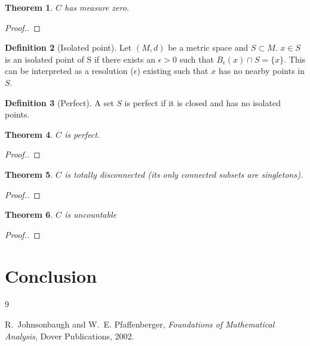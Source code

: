\documentclass[11pt]{article}
\theoremstyle{plain}
\newtheorem{theorem}{Theorem}[section]
\theoremstyle{definition}
\newtheorem{definition}[theorem]{Definition}
\theoremstyle{remark}
\begin{document}
\begin{theorem}
$C$ has measure zero.
\end{theorem}

\begin{proof}
[Proof.]
\end{proof}

\begin{definition} [Isolated point]
Let $(M,d)$ be a metric space and $S \subset M$. $x \in S$ is an isolated point of S if there exists an $\epsilon > 0$ such that $B_\epsilon(x) \cap S = \{x\}$. This can be interpreted as a resolution ($\epsilon$) existing such that $x$ has no nearby points in $S$.
\end{definition}

\begin{definition} [Perfect]
A set $S$ is perfect if it is closed and has no isolated points. 
\end{definition}

\begin{theorem}
$C$ is perfect.
\end{theorem}

\begin{proof}
[Proof.]
\end{proof}

\begin{theorem}
$C$ is totally disconnected (its only connected subsets are singletons).
\end{theorem}

\begin{proof}
[Proof.]
\end{proof}

\begin{theorem}
$C$ is uncountable
\end{theorem}

\begin{proof}
[Proof.]
\end{proof}

\section{Conclusion}
\begin{thebibliography}{9}

R.~Johnsonbaugh and W.~E. Pfaffenberger, \emph{Foundations of Mathematical Analysis}, Dover Publications, 2002.


\end{thebibliography}
\end{document}
